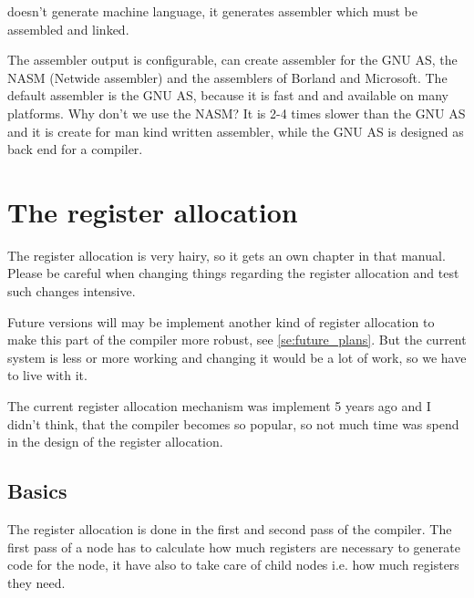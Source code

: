 \documentclass{report}
\begin{document}
\fpc doesn't generate machine language, it generates
assembler which must be assembled and linked.

The assembler output is configurable, \fpc can create
assembler for the GNU AS, the NASM (Netwide assembler) and
the assemblers of Borland and Microsoft. The default assembler
is the GNU AS, because it is fast and and available on
many platforms. Why don't we use the NASM? It is 2-4 times
slower than the GNU AS and it is create for
man kind written assembler, while the GNU AS is designed
as back end for a compiler.


\chapter{The register allocation}

The register allocation is very hairy, so it gets
an own chapter in that manual. Please be careful when changing things
regarding the register allocation and test such changes intensive.

Future versions will may be implement another kind of register allocation 
to make this part of the compiler more robust, see
\ref{se:future_plans}. But the current
system is less or more working and changing it would be a lot of
work, so we have to live with it.

The current register allocation mechanism was implement 5 years
ago and I didn't think, that the compiler becomes
so popular, so not much time was spend in the design
of the register allocation.

\section{Basics}

The register allocation is done in the first and second pass of
the compiler.
The first pass of a node has to calculate how much registers
are necessary to generate code for the node, it have
also to take care of child nodes i.e. how much registers
they need.
\end{document}
